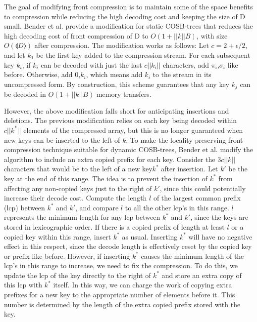 \documentclass{style}
\begin{document}
The goal of modifying front compression is to maintain some of the space benefits to compression while reducing the high decoding cost and keeping the size of D small. Bender et al.  provide a modification for static COSB-trees that reduces the high decoding cost of front compression of D to $O(1+||k||B)$, with size $O(\llangle{D}\rrangle{})$ after compression. The modification works as follows: Let $c = 2 + \epsilon/2$, and let $k_{1}$ be the first key added to the compression stream. For each subsequent key $k_{i}$, if $k_{i}$ can be decoded with just the last $c||k_{i}||$ characters, add $\pi_{i}$,$\sigma_{i}$ like before. Otherwise, add 0,$k_{i}$, which means add $k_{i}$ to the stream in its uncompressed form. By construction, this scheme guarantees that any key $k_{j}$ can be decoded in $O(1+||k||B)$ memory transfers.%

However, the above modification falls short for anticipating insertions and deletions. The previous modification relies on each key being decoded within $c||k^{*}||$ elements of the compressed array, but this is no longer guaranteed when new keys can be inserted to the left of $k$. To make the locality-preserving front compression technique suitable for dynamic COSB-trees, Bender et al. modify the algorithm to include an extra copied prefix for each key. Consider the $3c||k||$ characters that would be to the left of a new key$k^{*}$ after insertion. Let $k'$ be the key at the end of this range. The idea is to prevent the insertion of $k^{*}$ from affecting any non-copied keys just to the right of $k'$, since this could potentially increase their decode cost. Compute the length $l$ of the largest common prefix (lcp) between $k^{*}$ and $k'$, and compare $l$ to all the other lcp's in this range. $l$ represents the minimum length for any lcp between $k^{*}$ and $k'$, since the keys are stored in lexicographic order. If there is a copied prefix of length at least $l$ or a copied key within this range, insert $k^{*}$ as usual. Inserting $k^{*}$ will have no negative effect in this respect, since the decode length is effectively reset by the copied key or prefix like before. However, if inserting $k^{*}$ causes the minimum length of the lcp's in this range to increase, we need to fix the compression. To do this, we update the lcp of the key directly to the right of $k^{*}$ and store an extra copy of this lcp with $k^{*}$ itself. In this way, we can charge the work of copying extra prefixes for a new key to the appropriate number of elements before it. This number is determined by the length of the extra copied prefix stored with the key.
\end{document}
